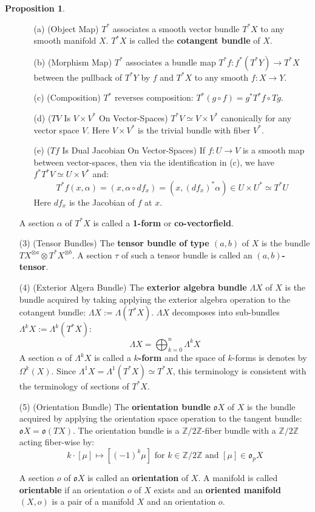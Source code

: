 \documentclass[12pt]{article}
\theoremstyle{definition}
\newtheorem{proposition}[theorem]{Proposition}
\numberwithin{equation}{section}
\newcommand{\Z}{{\mathbb Z}}
\begin{document}
\begin{proposition}
\begin{enumerate}
	\begin{itemize}
	\item[(a)] (Object Map) $T^*$ associates a smooth vector bundle $T^*X$ to any smooth manifold $X$. $T^*X$ is called the {\bf cotangent bundle} of $X$.
	\item[(b)] (Morphism Map) $T^*$ associates a bundle map $T^*f:f^*(T^*Y) \to T^*X$ between the pullback of $T^*Y$ by $f$ and $T^*X$ to any smooth $f:X \to Y$.
	\item[(c)] (Composition) $T^*$ reverses composition: $T^*(g \circ f) = g^*T^*f \circ Tg$.
	\item[(d)] ($TV$ Is $V \times V^*$ On Vector-Spaces) $T^*V \simeq V \times V^*$ canonically for any vector space $V$. Here $V \times V^*$ is the trivial bundle with fiber $V^*$. 
	\item[(e)] ($Tf$ Is Dual Jacobian On Vector-Spaces) If $f:U \to V$ is a smooth map between vector-spaces, then via the identification in (c), we have $f^*T^*V \simeq U \times V^*$ and:
	\[
	T^*f(x,\alpha) = (x,\alpha \circ df_x) = (x,(df_x)^*\alpha) \in U \times U^* \simeq T^*U
	\]
	Here $df_x$ is the Jacobian of $f$ at $x$.
	\end{itemize}
	A section $\alpha$ of $T^*X$ is called a {\bf 1-form} or {\bf co-vectorfield}.

	\item[(3)] (Tensor Bundles) The {\bf tensor bundle of type $(a,b)$} of $X$ is the bundle $TX^{\otimes a} \otimes T^*X^{\otimes b}$. A section $\tau$ of such a tensor bundle is called an {\bf $(a,b)$-tensor}. 

	\item[(4)] (Exterior Algera Bundle) The {\bf exterior algebra bundle} $\Lambda X$ of $X$ is the bundle acquired by taking applying the exterior algebra operation to the cotangent bundle: $\Lambda X := \Lambda(T^*X)$. $\Lambda X$ decomposes into sub-bundles $\Lambda^k X := \Lambda^k(T^*X)$:
	\[
	\Lambda X = \bigoplus_{k=0}^n \Lambda^k X
	\]
	A section $\alpha$ of $\Lambda^k X$ is called a {\bf $k$-form} and the space of $k$-forms is denotes by $\Omega^k(X)$. Since $\Lambda^1X = \Lambda^1(T^*X) \simeq T^*X$, this terminology is consistent with the terminology of sections of $T^*X$. 
	\item[(5)] (Orientation Bundle) The {\bf orientation bundle} $\mathfrak{o}X$ of $X$ is the bundle acquired by applying the orientation space operation to the tangent bundle: $\mathfrak{o}X = \mathfrak{o}(TX)$. The orientation bundle is a $\Z/2\Z$-fiber bundle with a $\Z/2\Z$ acting fiber-wise by:
	\[
	k \cdot [\mu] \mapsto [(-1)^k \mu] \text{ for }k \in \Z/2\Z \text{ and }[\mu] \in \mathfrak{o}_pX
	\]

	A section $o$ of $\mathfrak{o}X$ is called an {\bf orientation} of $X$. A manifold is called {\bf orientable} if an orientation $o$ of $X$ exists and an {\bf oriented manifold} $(X,o)$ is a pair of a manifold $X$ and an orientation $o$.
\end{enumerate}
\end{proposition}
\end{document}
